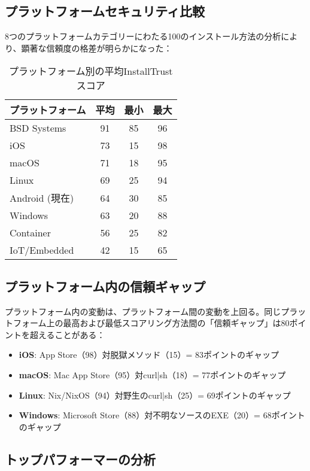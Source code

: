 \documentclass[Specialissue]{jsaiart}
\begin{document}
\subsection{プラットフォームセキュリティ比較}

8つのプラットフォームカテゴリーにわたる100のインストール方法の分析により、顕著な信頼度の格差が明らかになった：

\begin{table}[ht]
\centering
\caption{プラットフォーム別の平均InstallTrustスコア}
\begin{tabular}{lccc}
\toprule
\rowcolor{headergray}
\textbf{プラットフォーム} & \textbf{平均} & \textbf{最小} & \textbf{最大} \\
\midrule
BSD Systems & 91 & 85 & 96 \\
iOS & 73 & 15 & 98 \\
macOS & 71 & 18 & 95 \\
Linux & 69 & 25 & 94 \\
Android (現在) & 64 & 30 & 85 \\
Windows & 63 & 20 & 88 \\
Container & 56 & 25 & 82 \\
IoT/Embedded & 42 & 15 & 65 \\
\bottomrule
\end{tabular}
\end{table}

\subsection{プラットフォーム内の信頼ギャップ}

プラットフォーム内の変動は、プラットフォーム間の変動を上回る。同じプラットフォーム上の最高および最低スコアリング方法間の「信頼ギャップ」は80ポイントを超えることがある：

\begin{itemize}
    \item \textbf{iOS}: App Store（98）対脱獄メソッド（15）= 83ポイントのギャップ
    \item \textbf{macOS}: Mac App Store（95）対curl|sh（18）= 77ポイントのギャップ
    \item \textbf{Linux}: Nix/NixOS（94）対野生のcurl|sh（25）= 69ポイントのギャップ
    \item \textbf{Windows}: Microsoft Store（88）対不明なソースのEXE（20）= 68ポイントのギャップ
\end{itemize}

\subsection{トップパフォーマーの分析}
\end{document}
